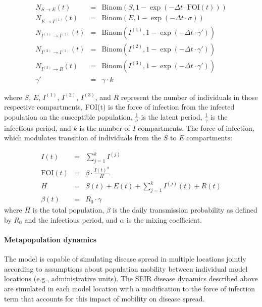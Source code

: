 {\begin{eqnarray}
N_{S \to E} (t) &=& \text{Binom}\left(S, 1 - \exp \left(- \Delta t \cdot \text{FOI}(t) \right)\right) \\
N_{E \to I^{( 1)}} (t) &=& \text{Binom}\left(E, 1 - \exp \left(- \Delta t \cdot \sigma  \right) \right) \\
N_{I^{( 1 )} \to I^{( 2)}} (t) &=& \text{Binom}\left(I^{( 1)}, 1 - \exp \left(- \Delta t \cdot \gamma' \right) \right) \\
N_{I^{(2)} \to I^{(3)}} (t) &=& \text{Binom}\left(I^{(2)}, 1 - \exp \left(- \Delta t \cdot \gamma' \right) \right) \\
N_{I^{(3)} \to R} (t) &=& \text{Binom}\left(I^{(3)}, 1 - \exp \left(- \Delta t \cdot \gamma' \right) \right) \\
\gamma' &=& \gamma \cdot k
\end{eqnarray}

where $S$, $E$, $I^{\left(1\right)}$, $I^{\left(2\right)}$, $I^{\left(3\right)}$, and $R$ represent the number of individuals in those respective compartments, FOI(t) is the force of infection from the infected population on the susceptible population, $\frac{1}{\sigma}$ is the latent period, $\frac{1}{\gamma}$ is the infectious period, and $k$ is the number of $I$ compartments. The force of infection, which modulates transition of individuals from the $S$ to $E$ compartments:

\begin{eqnarray}
I(t) &=& \sum\limits_{{j = 1}}^{k} I^{( j)} \\
\text{FOI}(t) &=&\beta \cdot \frac{I{(t)}^{\alpha}}{H} \\
H &=& S(t)+E(t)+\sum_{j=1}^{k} I^{\left(j\right)}(t)+R(t) \\
\beta(t) &=& R_{0}\cdot\gamma
\end{eqnarray}
where $H$ is the total population, $\beta$ is the daily transmission probability as defined by $R_0$ and the infectious period, and $\alpha$ is the mixing coefficient.




\paragraph{Metapopulation dynamics}
The model is capable of simulating disease spread in multiple locations jointly according to assumptions about population mobility between individual model locations (e.g., administrative units). The SEIR disease dynamics described above are simulated in each model location with a modification to the force of infection term that accounts for this impact of mobility on disease spread.

}
